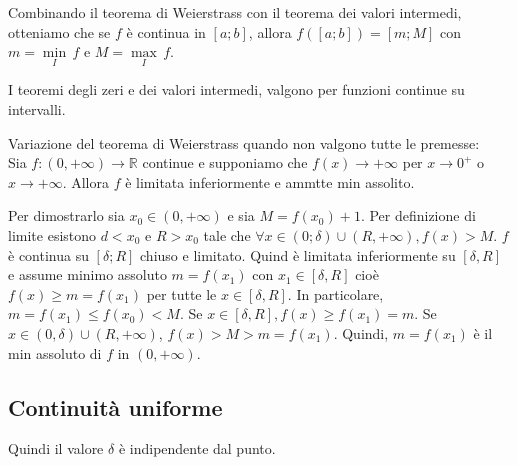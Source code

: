 \documentclass[a4paper]{article}
\begin{document}

Combinando il teorema di Weierstrass con il teorema dei valori intermedi,
otteniamo che se \(f\) è continua in \([a;b]\), allora \(f([a;b]) = [m;M]\)
con \(m = \underset{I}{\min}\, f\) e \(M = \underset{I}{\max}\, f\).

I teoremi degli zeri e dei valori intermedi, valgono per funzioni
continue su intervalli.

Variazione del teorema di Weierstrass quando non valgono tutte le premesse: \\
Sia \(f\colon (0, +\infty) \to \mathbb{R}\) continue e supponiamo che \(f(x) \to +\infty\)
per \(x\to 0^+\) o \(x\to +\infty\).
Allora \(f\) è limitata inferiormente e ammtte min assolito.

Per dimostrarlo sia \(x_0 \in (0, +\infty)\) e sia \(M = f(x_0) + 1\).
Per definizione di limite esistono \(d < x_0\) e \(R>x_0\)
tale che \(\forall x \in (0; \delta) \cup (R, +\infty), f(x) > M\).
\(f\) è continua su \([\delta; R]\) chiuso e limitato. Quind è limitata inferiormente
su \([\delta, R]\) e assume minimo assoluto \(m=f(x_1)\) con \(x_1 \in [\delta, R]\)
cioè \(f(x) \geq m = f(x_1)\) per tutte le \(x\in [\delta, R]\).
In particolare, \(m=f(x_1) \leq f(x_0) < M\).
Se \(x\in [\delta, R], f(x) \geq f(x_1) = m\).
Se \(x\in (0, \delta) \cup (R, +\infty)\), \(f(x) > M > m = f(x_1)\).
Quindi, \(m = f(x_1)\) è il min assoluto di \(f\) in \((0, +\infty)\).

\subsection{Continuità uniforme}


Quindi il valore \(\delta\) è indipendente dal punto.

\end{document}
